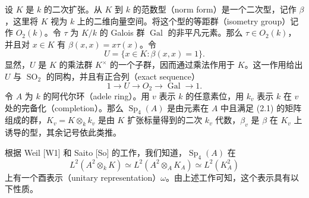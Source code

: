 设 $K$ 是 $k$ 的二次扩张。从 $K$ 到 $k$ 的范数型（norm form）是一个二次型，记作 $\beta$，这里将 $K$ 视为 $k$ 上的二维向量空间。将这个型的等距群（isometry group）记作 $O_2(k)$。令 $\tau$ 为 $K/k$ 的 Galois 群 $\operatorname{Gal}$ 的非平凡元素。那么 $\tau\in O_2(k)$，并且对 $x\in K$ 有 $\beta(x,x)=x\tau(x)$。令
\begin{equation}
 U=\{x\in K:\beta(x,x)=1\}.\tag{2.2}
\end{equation}
显然，$U$ 是 $K$ 的乘法群 $K^\times$ 的一个子群，因而通过乘法作用于 $K$。这一作用给出 $U$ 与 $\operatorname{SO}_2$ 的同构，并且有正合列（exact sequence）
\begin{equation}
 1\longrightarrow U\longrightarrow O_2\longrightarrow\operatorname{Gal}\longrightarrow1.
 \tag{2.3}
\end{equation}
令 $A$ 为 $k$ 的阿代尔环（adele ring）。用 $v$ 表示 $k$ 的任意素位，用 $k_v$ 表示 $k$ 在 $v$ 处的完备化（completion）。那么 $\operatorname{Sp}_4(A)$ 是由元素在 $A$ 中且满足 (2.1) 的矩阵组成的群，$K_v=K\otimes_k k_v$ 是由 $K$ 扩张标量得到的二次 $k_v$ 代数，$\beta_v$ 是 $\beta$ 在 $K_v$ 上诱导的型，其余记号依此类推。

根据 Weil [W1] 和 Saito [So] 的工作，我们知道，$\operatorname{Sp}_4(A)$ 在
\[
 L^2(A^2\otimes_k K)\simeq L^2(A^2\otimes_A K_A)\simeq L^2(K_A^2)
\]
上有一个酉表示（unitary representation）$\omega$。由上述工作可知，这个表示具有以下性质。

